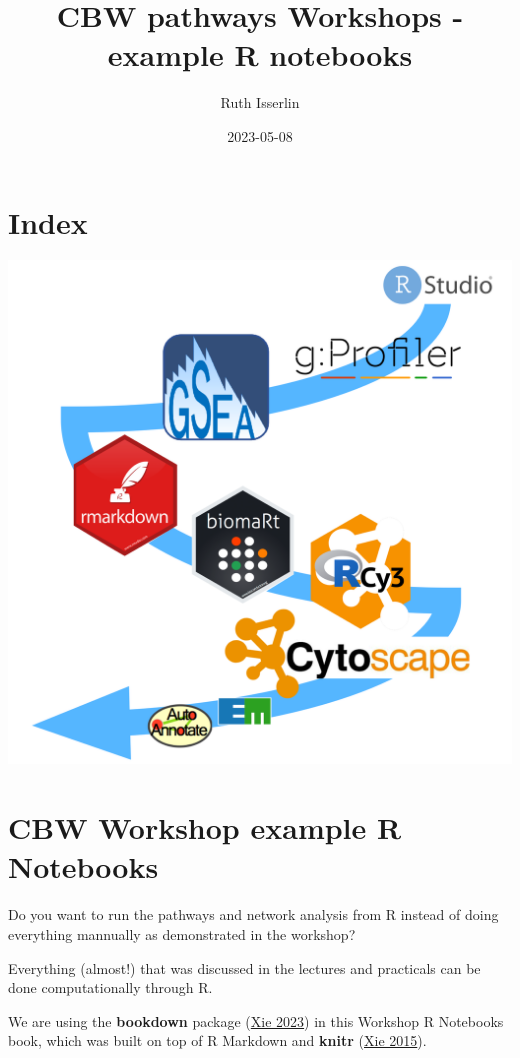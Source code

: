 \documentclass[
]{book}
\title{CBW pathways Workshops - example R notebooks}
\author{Ruth Isserlin}
\date{2023-05-08}
\begin{document}
\maketitle

{
\setcounter{tocdepth}{1}
\tableofcontents
}
\hypertarget{index}{%
\chapter{Index}\label{index}}

\includegraphics{./images/cover.png}

\hypertarget{intro}{%
\chapter{CBW Workshop example R Notebooks}\label{intro}}

Do you want to run the pathways and network analysis from R instead of doing everything mannually as demonstrated in the workshop?

Everything (almost!) that was discussed in the lectures and practicals can be done computationally through R.

We are using the \textbf{bookdown} package (\protect\hyperlink{ref-R-bookdown}{Xie 2023}) in this Workshop R Notebooks book, which was built on top of R Markdown and \textbf{knitr} (\protect\hyperlink{ref-xie2015}{Xie 2015}).
\end{document}
